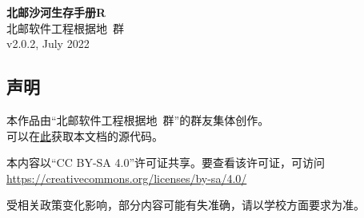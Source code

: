 \documentclass[a4paper]{article}
\begin{document}


\begin{titlepage}
    \centering
    {\Huge\rmfamily\bfseries 北邮沙河生存手册R} \\[6.5ex]
    {\Large\sffamily 北邮软件工程根据地\ 群} \\
    {\large\ttfamily v2.0.2, July 2022}\\[1.5ex]
\end{titlepage}

\begin{titlepage}
    \centering
    \section*{声明}

    本作品由“北邮软件工程根据地\ 群”的群友集体创作。\\
    可以在\href{https://github.com/BUPTSE/welcome}{此}获取本文档的源代码。

    \smallskip

    本内容以“CC BY-SA 4.0”许可证共享。要查看该许可证，可访问\\
    \href{https://creativecommons.org/licenses/by-sa/4.0/}{https://creativecommons.org/licenses/by-sa/4.0/}

    \smallskip

    受相关政策变化影响，部分内容可能有失准确，请以学校方面要求为准。

    \bigskip
    \tableofcontents
\end{titlepage}

\pagestyle{fancy}
\lhead{\small \leftmark}
\chead{}
\lfoot{}
\cfoot{\thepage}
\rfoot{}
\renewcommand{\headrulewidth}{0.4pt}



\newpage


\newpage


\newpage


\newpage


\newpage


\newpage


\newpage


\newpage


\newpage


\end{document}
